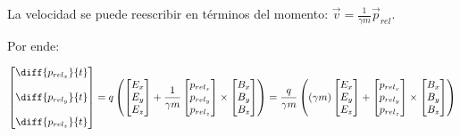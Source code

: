 La velocidad se puede reescribir en términos del momento: $ \vec{v} = \frac{1}{\gamma m} \vec{p}_{rel} $.

Por ende:

\begin{equation*}
	\begin{bmatrix} 
		\diff{p_{rel_x}}{t} \\ \\
		\diff{p_{rel_y}}{t} \\ \\ 
		\diff{p_{rel_z}}{t} 
	\end{bmatrix} = 
	q \left( 
	\begin{bmatrix} 
		E_x \\ E_y \\ E_z 
	\end{bmatrix} + 
\frac{1}{\gamma m}
	\begin{bmatrix} 
		p_{rel_x} \\ p_{rel_y} \\ p_{rel_z}
	\end{bmatrix} 
	\times 
	\begin{bmatrix} B_x \\ B_y \\ B_z \end{bmatrix} 
	\right) =
	\frac{q}{\gamma m} \left( 
(\gamma m)\begin{bmatrix} 
	E_x \\ E_y \\ E_z 
\end{bmatrix} + 
\begin{bmatrix} 
	p_{rel_x} \\ p_{rel_y} \\ p_{rel_z}
\end{bmatrix} 
\times 
\begin{bmatrix} B_x \\ B_y \\ B_z \end{bmatrix} 
\right)
\end{equation*}


